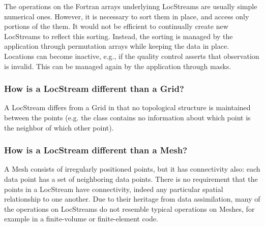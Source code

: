 The operations on the Fortran arrays underlyinng LocStreams are usually simple numerical ones. However,
it is necessary to sort them in place, and access only portions of the them. It would
not be efficient to continually create new LocStreams to reflect this sorting. Instead,
the sorting is managed by the application through permutation arrays while keeping
the data in place. Locations can become inactive, e.g., if the quality control asserts that
observation is invalid. This can be managed again by the application through masks.

\subsubsection{How is a LocStream different than a Grid?}
A LocStream differs from a Grid in that no topological structure is
maintained between the points
(e.g. the class contains no information about which point is the neighbor
of which other point).

\subsubsection{How is a LocStream different than a Mesh?}
A Mesh consists of irregularly positioned points, but it has connectivity
also: each data point has a set of neighboring data points. There is no requirement that the
points in a LocStream have connectivity, indeed any particular spatial relationship to
one another.
Due to their heritage from data assimilation, many of the operations on LocStreams
do not resemble typical operations on Meshes, for example in a finite-volume
or finite-element code. 
